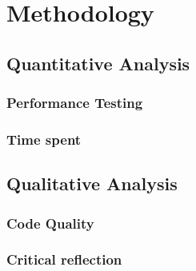 \chapter{Methodology}

\section{Quantitative Analysis}

\subsection{Performance Testing}
\subsection{Time spent}

\section{Qualitative Analysis}

\subsection{Code Quality}
\subsection{Critical reflection}
